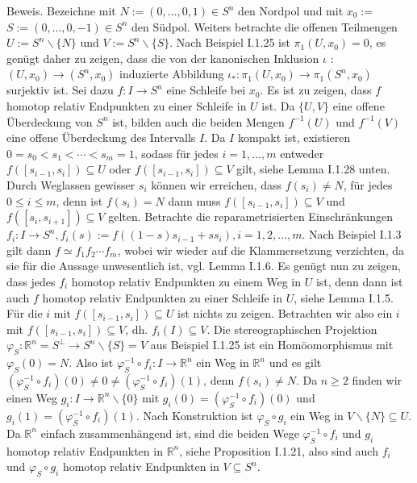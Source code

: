 \documentclass[10pt, letterpaper]{article}
\begin{document}
Beweis. Bezeichne mit $N:=(0, \ldots, 0,1) \in S^{n}$ den Nordpol und mit $x_{0}:=$ $S:=(0, \ldots, 0,-1) \in S^{n}$ den Südpol. Weiters betrachte die offenen Teilmengen $U:=S^{n} \backslash\{N\}$ und $V:=S^{n} \backslash\{S\}$. Nach Beispiel I.1.25 ist $\pi_{1}\left(U, x_{0}\right)=0$, es genügt daher zu zeigen, dass die von der kanonischen Inklusion $\iota$ : $\left(U, x_{0}\right) \rightarrow\left(S^{n}, x_{0}\right)$ induzierte Abbildung $\iota_{*}: \pi_{1}\left(U, x_{0}\right) \rightarrow \pi_{1}\left(S^{n}, x_{0}\right)$ surjektiv ist. Sei dazu $f: I \rightarrow S^{n}$ eine Schleife bei $x_{0}$. Es ist zu zeigen, dass $f$ homotop relativ Endpunkten zu einer Schleife in $U$ ist. Da $\{U, V\}$ eine offene Überdeckung von $S^{n}$ ist, bilden auch die beiden Mengen $f^{-1}(U)$ und $f^{-1}(V)$ eine offene Überdeckung des Intervalls $I$. Da $I$ kompakt ist, existieren $0=s_{0}<s_{1}<\cdots<s_{m}=1$, sodass für jedes $i=1, \ldots, m$ entweder $f\left(\left[s_{i-1}, s_{i}\right]\right) \subseteq U$ oder $f\left(\left[s_{i-1}, s_{i}\right]\right) \subseteq V$ gilt, siehe Lemma I.1.28 unten. Durch Weglassen gewisser $s_{i}$ können wir erreichen, dass $f\left(s_{i}\right) \neq N$, für jedes $0 \leq i \leq m$, denn ist $f\left(s_{i}\right)=N$ dann muss $f\left(\left[s_{i-1}, s_{i}\right]\right) \subseteq V$ und $f\left(\left[s_{i}, s_{i+1}\right]\right) \subseteq V$ gelten. Betrachte die reparametrisierten Einschränkungen $f_{i}: I \rightarrow S^{n}, f_{i}(s):=f\left((1-s) s_{i-1}+s s_{i}\right), i=1,2, \ldots, m$. Nach Beispiel I.1.3 gilt dann $f \simeq f_{1} f_{2} \cdots f_{m}$, wobei wir wieder auf die Klammersetzung verzichten, da sie für die Aussage unwesentlich ist, vgl. Lemma I.1.6. Es genügt nun zu zeigen, dass jedes $f_{i}$ homotop relativ Endpunkten zu einem Weg in $U$ ist, denn dann ist auch $f$ homotop relativ Endpunkten zu einer Schleife in $U$, siehe Lemma I.1.5. Für die $i$ mit $f\left(\left[s_{i-1}, s_{i}\right]\right) \subseteq U$ ist nichts zu zeigen. Betrachten wir also ein $i$ mit $f\left(\left[s_{i-1}, s_{i}\right]\right) \subseteq V$, dh. $f_{i}(I) \subseteq V$. Die stereographischen Projektion $\varphi_{S}: \mathbb{R}^{n}=S^{\perp} \rightarrow S^{n} \backslash\{S\}=V$ aus Beispiel I.1.25 ist ein Homöomorphismus mit $\varphi_{S}(0)=N$. Also ist $\varphi_{S}^{-1} \circ f_{i}: I \rightarrow \mathbb{R}^{n}$ ein Weg in $\mathbb{R}^{n}$ und es gilt $\left(\varphi_{S}^{-1} \circ f_{i}\right)(0) \neq 0 \neq\left(\varphi_{S}^{-1} \circ f_{i}\right)(1)$, denn $f\left(s_{i}\right) \neq N$. Da $n \geq 2$ finden wir einen Weg $g_{i}: I \rightarrow \mathbb{R}^{n} \backslash\{0\}$ mit $g_{i}(0)=\left(\varphi_{S}^{-1} \circ f_{i}\right)(0)$ und $g_{i}(1)=\left(\varphi_{S}^{-1} \circ f_{i}\right)(1)$. Nach Konstruktion ist $\varphi_{S} \circ g_{i}$ ein Weg in $V \backslash\{N\} \subseteq U$. Da $\mathbb{R}^{n}$ einfach zusammenhängend ist, sind die beiden Wege $\varphi_{S}^{-1} \circ f_{i}$ und $g_{i}$ homotop relativ Endpunkten in $\mathbb{R}^{n}$, siehe Proposition I.1.21, also sind auch $f_{i}$ und $\varphi_{S} \circ g_{i}$ homotop relativ Endpunkten in $V \subseteq S^{n}$.\\
\end{document}
